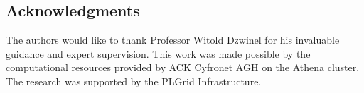 \documentclass[11pt, english]{article}
\begin{document}
%
%
%






%
%

\subsection*{Acknowledgments}
The authors would like to thank Professor Witold Dzwinel for his invaluable guidance and expert supervision. This work was made possible by the computational resources provided by ACK Cyfronet AGH on the Athena cluster. The research was supported by the PLGrid Infrastructure.


%
%
\end{document}
